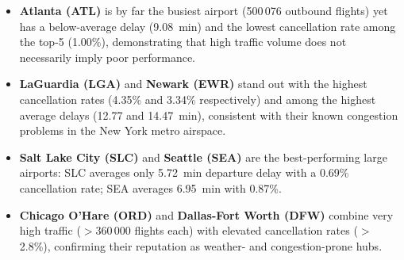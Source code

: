 \documentclass[12pt,a4paper]{article}
\begin{document}
\begin{itemize}
    \item \textbf{Atlanta (ATL)} is by far the busiest airport (500\,076
          outbound flights) yet has a below-average delay (9.08~min) and the
          lowest cancellation rate among the top-5 (1.00\%), demonstrating
          that high traffic volume does not necessarily imply poor
          performance.
    \item \textbf{LaGuardia (LGA)} and \textbf{Newark (EWR)} stand out with
          the highest cancellation rates (4.35\% and 3.34\% respectively) and
          among the highest average delays (12.77 and 14.47~min), consistent
          with their known congestion problems in the New York metro airspace.
    \item \textbf{Salt Lake City (SLC)} and \textbf{Seattle (SEA)} are the
          best-performing large airports: SLC averages only 5.72~min departure
          delay with a 0.69\% cancellation rate; SEA averages 6.95~min with
          0.87\%.
    \item \textbf{Chicago O'Hare (ORD)} and \textbf{Dallas-Fort Worth (DFW)}
          combine very high traffic ($>$360\,000 flights each) with elevated
          cancellation rates ($>$2.8\%), confirming their reputation as
          weather- and congestion-prone hubs.
\end{itemize}
\end{document}
